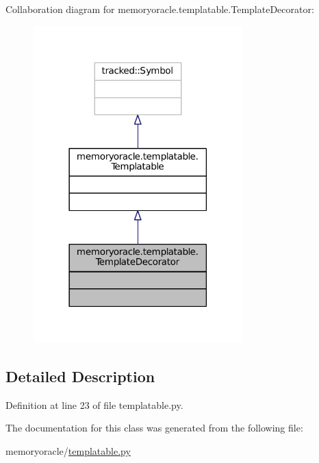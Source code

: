 Collaboration diagram for memoryoracle.\+templatable.\+Template\+Decorator\+:\nopagebreak
\begin{figure}[H]
\begin{center}
\leavevmode
\includegraphics[width=230pt]{classmemoryoracle_1_1templatable_1_1TemplateDecorator__coll__graph}
\end{center}
\end{figure}


\subsection{Detailed Description}


Definition at line 23 of file templatable.\+py.



The documentation for this class was generated from the following file\+:\begin{DoxyCompactItemize}
\item 
memoryoracle/\hyperlink{templatable_8py}{templatable.\+py}\end{DoxyCompactItemize}
